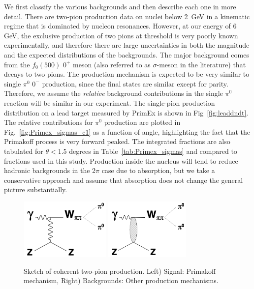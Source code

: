 We first classify the various backgrounds and then describe each one in
more detail. There are two-pion production data on
nuclei below 2~GeV \cite{schadm2005double} in a kinematic regime that
is dominated by nucleon resonances. However, at our energy of 6 GeV,
the exclusive production of two pions at threshold is very poorly
known experimentally, and therefore there are large uncertainties in
both the magnitude and the expected distributions of the backgrounds.
The major background comes from the $f_0(500)$ $0^{+}$ meson (also
referred to as $\sigma$-meson in the literature) that decays to two
pions. The production mechanism is expected to be very similar to
single $\pi^0$ $0^{-}$ production, since the final states are similar
except for parity. Therefore, we assume the {\em relative} background
contributions in the single $\pi^0$ reaction will be similar in our
experiment. The single-pion production distribution on a lead target
measured by PrimEx \cite{Larin:2018} is shown in
Fig~\ref{fig:leaddndt}. The relative contributions for $\pi^0$
production are plotted in Fig.~\ref{fig:Primex_sigmas_c1} as a
function of angle, highlighting the fact that the Primakoff process is
very forward peaked. The integrated fractions are also tabulated for
$\theta < 1.5$ degrees in Table~\ref{tab:Primex_sigmas} and compared
to fractions used in this study.  Production inside the nucleus will
tend to reduce hadronic backgrounds in the 2$\pi$ case due to
absorption, but we take a conservative approach and assume that absorption does
not change the general picture substantially.

 \begin{figure}[tbh]
\begin{center}
\includegraphics[height=3cm,clip=true]{figures/Diagram_Primakoff.png} \hspace{1cm}
\includegraphics[height=3cm,clip=true]{figures/Diagram_hadronic.png}
\caption{Sketch of coherent two-pion production. Left) Signal: Primakoff mechanism, Right) Backgrounds: Other production mechanisms.
\label{fig:Diagram}}
\end{center}
\end{figure}

